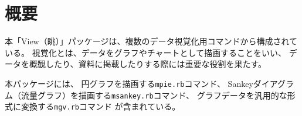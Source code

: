 

\section{概要}

本「View（眺）」パッケージは、複数のデータ視覚化用コマンドから構成されている。
視覚化とは、データをグラフやチャートとして描画することをいい、
データを概観したり、資料に掲載したりする際には重要な役割を果たす。

本パッケージには、
円グラフを描画する\verb|mpie.rb|コマンド、
Sankeyダイアグラム（流量グラフ）を描画する\verb|msankey.rb|コマンド、
グラフデータを汎用的な形式に変換する\verb|mgv.rb|コマンド
が含まれている。




